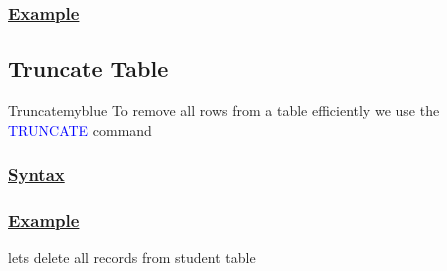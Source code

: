 

\subsubsection*{\underline{Example}}
\subsection{Truncate Table}
\begin{prettyBox}{Truncate}{myblue}
    To remove all rows from a table efficiently we use the \textcolor{blue}{TRUNCATE} command
\end{prettyBox}

\subsubsection*{\underline{Syntax}}




\subsubsection*{\underline{Example}}
lets delete all records from student table



